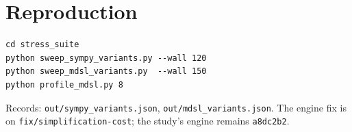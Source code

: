 \documentclass[11pt,a4paper]{article}
\newcommand{\code}[1]{\texttt{\small #1}}
\begin{document}
\section{Reproduction}

\begin{lstlisting}
cd stress_suite
python sweep_sympy_variants.py --wall 120
python sweep_mdsl_variants.py  --wall 150
python profile_mdsl.py 8
\end{lstlisting}

\noindent Records: \code{out/sympy\_variants.json}, \code{out/mdsl\_variants.json}.
The engine fix is on \code{fix/simplification-cost}; the study's engine remains
\code{a8dc2b2}.
\end{document}
